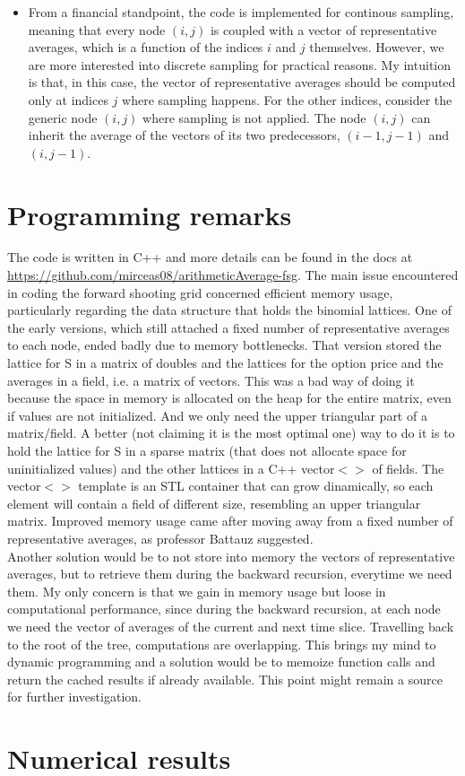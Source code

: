 \documentclass[12pt]{article}
\numberwithin{equation}{section}
\begin{document}
\begin{itemize}
\item From a financial standpoint, the code is implemented for continous sampling, meaning that every node $(i,j)$ is coupled with a vector of representative averages, which is a function of the indices $i$ and $j$ themselves. However, we are more interested into discrete sampling for practical reasons. My intuition is that, in this case, the vector of representative averages should be computed only at indices $j$ where sampling happens. For the other indices, consider the generic node $(i,j)$ where sampling is not applied. The node $(i,j)$ can inherit the average of the vectors of its two predecessors, $(i-1,j-1)$ and $(i,j-1)$.
\end{itemize}

\section{Programming remarks}
The code is written in C++ and more details can be found in the docs at \url{https://github.com/mirceas08/arithmeticAverage-fsg}. The main issue encountered in coding the forward shooting grid concerned efficient memory usage, particularly regarding the data structure that holds the binomial lattices. One of the early versions, which still attached a fixed number of representative averages to each node, ended badly due to memory bottlenecks. That version stored the lattice for S in a matrix of doubles and the lattices for the option price and the averages in a field, i.e. a matrix of vectors. This was a bad way of doing it because the space in memory is allocated on the heap for the entire matrix, even if values are not initialized. And we only need the upper triangular part of a matrix/field. A better (not claiming it is the most optimal one) way to do it is to hold the lattice for S in a sparse matrix (that does not allocate space for uninitialized values) and the other lattices in a C++ vector$<>$ of fields. The vector$<>$ template is an STL container that can grow dinamically, so each element will contain a field of different size, resembling an upper triangular matrix. Improved memory usage came after moving away from a fixed number of representative averages, as professor Battauz suggested.\\
\newline
Another solution would be to not store into memory the vectors of representative averages, but to retrieve them during the backward recursion, everytime we need them. My only concern is that we gain in memory usage but loose in computational performance, since during the backward recursion, at each node we need the vector of averages of the current and next time slice. Travelling back to the root of the tree, computations are overlapping. This brings my mind to dynamic programming and a solution would be to memoize function calls and return the cached results if already available. This point might remain a source for further investigation.

\section{Numerical results}





\nocite{*}

\newpage




\end{document}
